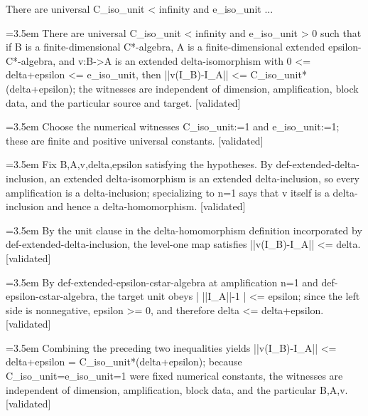 \documentclass{article}
\newcommand{\step}[1]{\par\noindent\hangindent=3.5em\hangafter=1%
  \makebox[3.5em][l]{\textbf{#1.}}}
\newcommand{\steptag}[1]{\hfill{\small\textsf{[#1]}}}
\begin{document}
\begin{proofbox}{There are universal C\_iso\_unit < infinity and e\_iso\_unit ...}
\step{1} There are universal C\_iso\_unit < infinity and e\_iso\_unit > 0 such that if B is a finite-dimensional C*-algebra, A is a finite-dimensional extended epsilon-C*-algebra, and v:B->A is an extended delta-isomorphism with 0 <= delta+epsilon <= e\_iso\_unit, then ||v(I\_B)-I\_A|| <= C\_iso\_unit*(delta+epsilon); the witnesses are independent of dimension, amplification, block data, and the particular source and target. \steptag{validated} \\[6pt]
\step{1.1} Choose the numerical witnesses C\_iso\_unit:=1 and e\_iso\_unit:=1; these are finite and positive universal constants. \steptag{validated} \\[4pt]
\step{1.2} Fix B,A,v,delta,epsilon satisfying the hypotheses. By def-extended-delta-inclusion, an extended delta-isomorphism is an extended delta-inclusion, so every amplification is a delta-inclusion; specializing to n=1 says that v itself is a delta-inclusion and hence a delta-homomorphism. \steptag{validated} \\[4pt]
\step{1.3} By the unit clause in the delta-homomorphism definition incorporated by def-extended-delta-inclusion, the level-one map satisfies ||v(I\_B)-I\_A|| <= delta. \steptag{validated} \\[4pt]
\step{1.4} By def-extended-epsilon-cstar-algebra at amplification n=1 and def-epsilon-cstar-algebra, the target unit obeys | ||I\_A||-1 | <= epsilon; since the left side is nonnegative, epsilon >= 0, and therefore delta <= delta+epsilon. \steptag{validated} \\[4pt]
\step{1.5} Combining the preceding two inequalities yields ||v(I\_B)-I\_A|| <= delta+epsilon = C\_iso\_unit*(delta+epsilon); because C\_iso\_unit=e\_iso\_unit=1 were fixed numerical constants, the witnesses are independent of dimension, amplification, block data, and the particular B,A,v. \steptag{validated} \\[4pt]
\end{proofbox}
\end{document}
